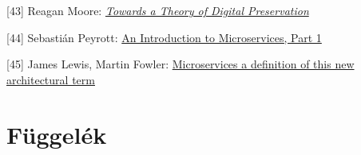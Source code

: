 \documentclass[11pt,magyar,a4paper,oneside,]{report}
\begin{document}
{[}43{]} Reagan Moore:
\href{http://ijdc.net/index.php/ijdc/article/view/63/42}{\emph{Towards a
Theory of Digital Preservation}}

{[}44{]} Sebastián Peyrott:
\href{https://auth0.com/blog/2015/09/04/an-introduction-to-microservices-part-1/}{An
Introduction to Microservices, Part 1}

{[}45{]} James Lewis, Martin Fowler:
\href{http://martinfowler.com/articles/microservices.html}{Microservices
a definition of this new architectural term}

\listoftables
\listoffigures



\appendix

\chapter{Függelék}\label{fuxfcggeluxe9k}
\end{document}
